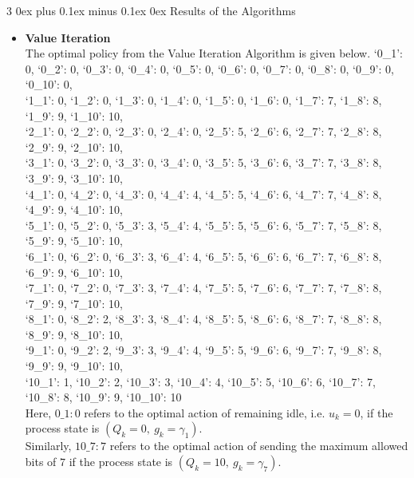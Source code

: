 \documentclass[12pt, draftcls, onecolumn]{IEEEtran}
\makeatletter
\def\subsubsection{\@startsection{subsubsection}%
                                 {3}%
                                 {\z@}%
                                 {0ex plus 0.1ex minus 0.1ex}%
                                 {0ex}%
                                 {\normalfont\normalsize\bfseries}}%
\makeatother
\begin{document}
\subsubsection{Results of the Algorithms}
\begin{itemize}
    \item \textbf{Value Iteration}
        \\The optimal policy from the Value Iteration Algorithm is given below.\newline
        \begingroup
            \fontsize{10pt}{10pt}\selectfont
            {`0\_1': 0, `0\_2': 0, `0\_3': 0, `0\_4': 0, `0\_5': 0, `0\_6': 0, `0\_7': 0, `0\_8': 0, `0\_9': 0, `0\_10': 0,\\ `1\_1': 0, `1\_2': 0, `1\_3': 0, `1\_4': 0, `1\_5': 0, `1\_6': 0, `1\_7': 7, `1\_8': 8, `1\_9': 9, `1\_10': 10,\\ `2\_1': 0, `2\_2': 0, `2\_3': 0, `2\_4': 0, `2\_5': 5, `2\_6': 6, `2\_7': 7, `2\_8': 8, `2\_9': 9, `2\_10': 10,\\ `3\_1': 0, `3\_2': 0, `3\_3': 0, `3\_4': 0, `3\_5': 5, `3\_6': 6, `3\_7': 7, `3\_8': 8, `3\_9': 9, `3\_10': 10,\\ `4\_1': 0, `4\_2': 0, `4\_3': 0, `4\_4': 4, `4\_5': 5, `4\_6': 6, `4\_7': 7, `4\_8': 8, `4\_9': 9, `4\_10': 10,\\ `5\_1': 0, `5\_2': 0, `5\_3': 3, `5\_4': 4, `5\_5': 5, `5\_6': 6, `5\_7': 7, `5\_8': 8, `5\_9': 9, `5\_10': 10,\\ `6\_1': 0, `6\_2': 0, `6\_3': 3, `6\_4': 4, `6\_5': 5, `6\_6': 6, `6\_7': 7, `6\_8': 8, `6\_9': 9, `6\_10': 10,\\ `7\_1': 0, `7\_2': 0, `7\_3': 3, `7\_4': 4, `7\_5': 5, `7\_6': 6, `7\_7': 7, `7\_8': 8, `7\_9': 9, `7\_10': 10,\\ `8\_1': 0, `8\_2': 2, `8\_3': 3, `8\_4': 4, `8\_5': 5, `8\_6': 6, `8\_7': 7, `8\_8': 8, `8\_9': 9, `8\_10': 10,\\ `9\_1': 0, `9\_2': 2, `9\_3': 3, `9\_4': 4, `9\_5': 5, `9\_6': 6, `9\_7': 7, `9\_8': 8, `9\_9': 9, `9\_10': 10,\\ `10\_1': 1, `10\_2': 2, `10\_3': 3, `10\_4': 4, `10\_5': 5, `10\_6': 6, `10\_7': 7, `10\_8': 8, `10\_9': 9, `10\_10': 10}
        \endgroup
        \\Here, $0\_1: 0$ refers to the optimal action of remaining idle, i.e. $u_k=0$, if the process state is $(Q_k=0,\ g_k=\gamma_1)$.
        \\Similarly, $10\_7: 7$ refers to the optimal action of sending the maximum allowed bits of $7$ if the process state is $(Q_k=10,\ g_k=\gamma_7)$.

\end{itemize}
\end{document}

